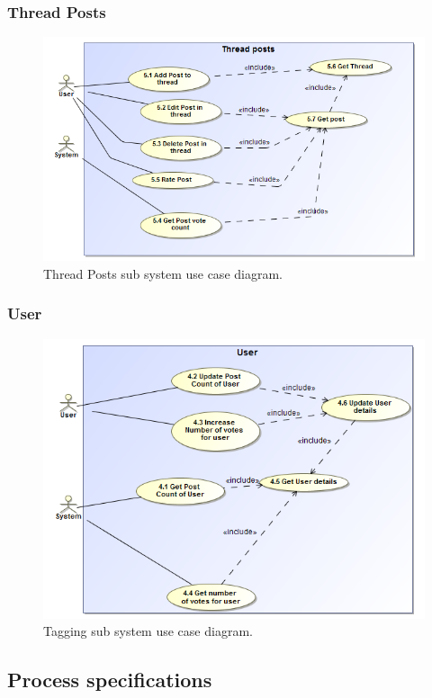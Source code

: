 \documentclass [a4paper,12pt] {article}
\begin{document}
		\subsubsection{Thread Posts}
			\begin{figure}[H]
				\centering
				\includegraphics[width=1.0\textwidth]{ThreadPostsUC.png}
				\caption{Thread Posts sub system use case diagram.}
			\end{figure}	
		\subsubsection{User}
			\begin{figure}[H]
				\centering
				\includegraphics[width=1.0\textwidth]{USerUC.png}
				\caption{Tagging sub system use case diagram.}
			\end{figure}
\pagebreak
	\subsection{Process specifications}
\end{document}
